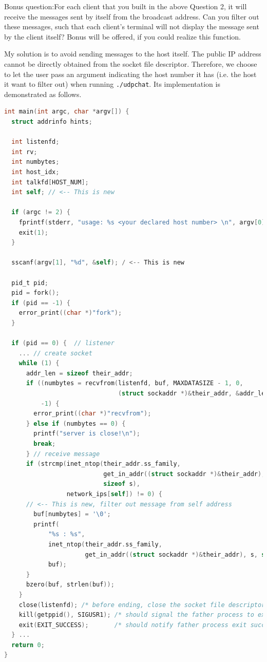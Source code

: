\begin{exercise}[]{Bonus question:For each client that you built in the above Question 2, it will receive the messages sent by itself from the broadcast address. Can you filter out these messages, such that each client’s terminal will not display the message sent by the client itself? Bonus will be offered, if you could realize this function. }
  
My solution is to avoid sending messages to the host itself. The public IP address cannot be directly obtained from the socket file descriptor. Therefore, we choose to let the user pass an argument indicating the host number it has (i.e. the host it want to filter out) when running \texttt{./udpchat}. Its implementation is demonstrated as follows.


\begin{lstlisting}[language=C]
int main(int argc, char *argv[]) {
  struct addrinfo hints;

  int listenfd;
  int rv;
  int numbytes;
  int host_idx;
  int talkfd[HOST_NUM];
  int self; // <-- This is new

  if (argc != 2) {
    fprintf(stderr, "usage: %s <your declared host number> \n", argv[0]);
    exit(1);
  }

  sscanf(argv[1], "%d", &self); / <-- This is new

  pid_t pid;
  pid = fork();
  if (pid == -1) {
    error_print((char *)"fork");
  }

  if (pid == 0) {  // listener
    ... // create socket
    while (1) {
      addr_len = sizeof their_addr;
      if ((numbytes = recvfrom(listenfd, buf, MAXDATASIZE - 1, 0,
                               (struct sockaddr *)&their_addr, &addr_len)) ==
          -1) {
        error_print((char *)"recvfrom");
      } else if (numbytes == 0) {
        printf("server is close!\n");
        break;
      } // receive message
      if (strcmp(inet_ntop(their_addr.ss_family,
                           get_in_addr((struct sockaddr *)&their_addr), s,
                           sizeof s),
                 network_ips[self]) != 0) {
      // <-- This is new, filter out message from self address
        buf[numbytes] = '\0';
        printf(
            "%s : %s",
            inet_ntop(their_addr.ss_family,
                      get_in_addr((struct sockaddr *)&their_addr), s, sizeof s),
            buf);
      }
      bzero(buf, strlen(buf));
    }
    close(listenfd); /* before ending, close the socket file descriptor */
    kill(getppid(), SIGUSR1); /* should signal the father process to exit */
    exit(EXIT_SUCCESS);       /* should notify father process exit success */
  } ...
  return 0;
}
\end{lstlisting}




\end{exercise}
